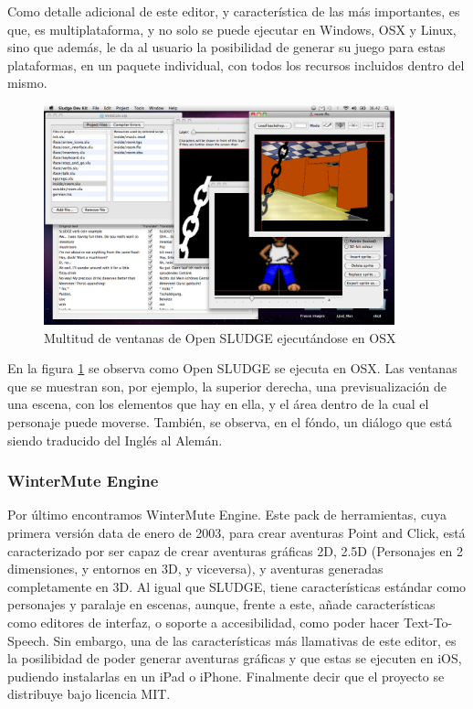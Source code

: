 Como detalle adicional de este editor, y característica de las más importantes, es que, es multiplataforma, y no solo se puede ejecutar en Windows, OSX y Linux, sino que además, le da al usuario la posibilidad de generar su juego para estas plataformas, en un paquete individual, con todos los recursos incluidos dentro del mismo.

\begin{figure}[htb]
	\centerline{\includegraphics[height=2.5in]{figures/sludge.png}}
	\caption[Open SLUDGE]{Multitud de ventanas de Open SLUDGE ejecutándose en OSX}
	\label{sludgefigure}
\end{figure}

En la figura \ref{sludgefigure} se observa como Open SLUDGE se ejecuta en OSX. Las ventanas que se muestran son, por ejemplo, la superior derecha, una previsualización de una escena, con los elementos que hay en ella, y el área dentro de la cual el personaje puede moverse. También, se observa, en el fóndo, un diálogo que está siendo traducido del Inglés al Alemán.

\subsubsection{WinterMute Engine}
\label{wintermute}

Por último encontramos WinterMute Engine. Este pack de herramientas, cuya primera versión data de enero de 2003, para crear aventuras Point and Click, está caracterizado por ser capaz de crear aventuras gráficas 2D, 2.5D (Personajes en 2 dimensiones, y entornos en 3D, y viceversa), y aventuras generadas completamente en 3D. Al igual que SLUDGE, tiene características estándar como personajes y paralaje en escenas, aunque, frente a este, añade características como editores de interfaz, o soporte a accesibilidad, como poder hacer Text-To-Speech. Sin embargo, una de las características más llamativas de este editor, es la posilibidad de poder generar aventuras gráficas y que estas se ejecuten en iOS, pudiendo instalarlas en un iPad o iPhone. Finalmente decir que el proyecto se distribuye bajo licencia MIT.

